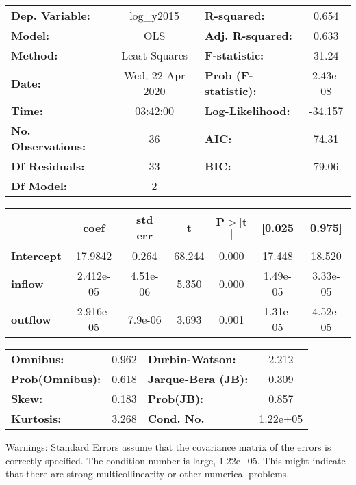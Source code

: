 \begin{center}
\begin{tabular}{lclc}
\toprule
\textbf{Dep. Variable:}    &    log\_y2015    & \textbf{  R-squared:         } &     0.654   \\
\textbf{Model:}            &       OLS        & \textbf{  Adj. R-squared:    } &     0.633   \\
\textbf{Method:}           &  Least Squares   & \textbf{  F-statistic:       } &     31.24   \\
\textbf{Date:}             & Wed, 22 Apr 2020 & \textbf{  Prob (F-statistic):} &  2.43e-08   \\
\textbf{Time:}             &     03:42:00     & \textbf{  Log-Likelihood:    } &   -34.157   \\
\textbf{No. Observations:} &          36      & \textbf{  AIC:               } &     74.31   \\
\textbf{Df Residuals:}     &          33      & \textbf{  BIC:               } &     79.06   \\
\textbf{Df Model:}         &           2      & \textbf{                     } &             \\
\bottomrule
\end{tabular}
\begin{tabular}{lcccccc}
                   & \textbf{coef} & \textbf{std err} & \textbf{t} & \textbf{P$> |$t$|$} & \textbf{[0.025} & \textbf{0.975]}  \\
\midrule
\textbf{Intercept} &      17.9842  &        0.264     &    68.244  &         0.000        &       17.448    &       18.520     \\
\textbf{inflow}    &    2.412e-05  &     4.51e-06     &     5.350  &         0.000        &     1.49e-05    &     3.33e-05     \\
\textbf{outflow}   &    2.916e-05  &      7.9e-06     &     3.693  &         0.001        &     1.31e-05    &     4.52e-05     \\
\bottomrule
\end{tabular}
\begin{tabular}{lclc}
\textbf{Omnibus:}       &  0.962 & \textbf{  Durbin-Watson:     } &    2.212  \\
\textbf{Prob(Omnibus):} &  0.618 & \textbf{  Jarque-Bera (JB):  } &    0.309  \\
\textbf{Skew:}          &  0.183 & \textbf{  Prob(JB):          } &    0.857  \\
\textbf{Kurtosis:}      &  3.268 & \textbf{  Cond. No.          } & 1.22e+05  \\
\bottomrule
\end{tabular}
\end{center}

Warnings: \newline
 [1] Standard Errors assume that the covariance matrix of the errors is correctly specified. \newline
 [2] The condition number is large, 1.22e+05. This might indicate that there are \newline
 strong multicollinearity or other numerical problems.